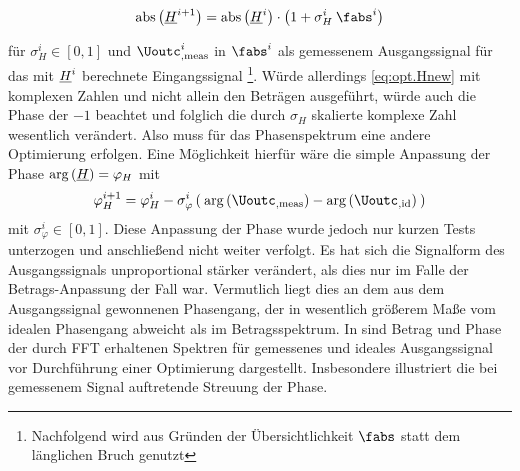 \documentclass[../Report.tex]{subfiles}
\begin{document}
\begin{align}
\label{eq:opt.Hnew}
	\mathrm{abs} \left( \Hcompl^{i+1} \right)
		=\mathrm{abs} \left( \Hcompl^{i}  \right) \cdot
		\left( 1 + \sigma_H^i \: \fabs^{i}	\right)					 
\end{align}

für $\sigma_H^i \in \left[ 0 , 1 \right]$ und $\Uoutc_{, \mathrm{meas}}^{i}$ in $\fabs^{i}$ als gemessenem Ausgangssignal für das mit $\underline{H}^{i}$ berechnete Eingangssignal \footnote{Nachfolgend wird aus Gründen der Übersichtlichkeit $\fabs$ statt dem länglichen Bruch genutzt}.
Würde allerdings \eqref{eq:opt.Hnew} mit komplexen Zahlen und nicht allein den Beträgen ausgeführt, würde auch die Phase der $-1$ beachtet und folglich die durch $\sigma_H$ skalierte komplexe Zahl wesentlich verändert. Also muss für das Phasenspektrum eine andere Optimierung erfolgen.
Eine Möglichkeit hierfür wäre die simple Anpassung der Phase $ \mathrm{arg} \left( \underline{H} \right) = \varphi_H$ mit 
\begin{align}
\label{eq:opt.HnewPhase}
	\varphi_H^{i+1} = \varphi_H^{i} - \sigma_{\varphi}^{i} 
			\left( \: \mathrm{arg} \left( \Uoutc_{, \mathrm{meas}} \right)
					- \mathrm{arg} \left( \Uoutc_{, \mathrm{id}} \right) \: \right)
\end{align}
mit $\sigma_{\varphi}^i \in \left[ 0 , 1 \right]$. Diese Anpassung der Phase wurde jedoch nur kurzen Tests unterzogen und anschließend nicht weiter verfolgt. Es hat sich die Signalform des Ausgangssignals unproportional stärker verändert, als dies nur im Falle der Betrags-Anpassung der Fall war. Vermutlich %
liegt dies an dem aus dem Ausgangssignal gewonnenen Phasengang, der in wesentlich größerem Maße vom idealen Phasengang abweicht als im Betragsspektrum. 
In  sind Betrag und Phase der durch FFT erhaltenen Spektren für gemessenes und ideales Ausgangssignal vor Durchführung einer Optimierung dargestellt. Insbesondere illustriert  die bei gemessenem Signal auftretende Streuung der Phase. 
\\


 \absSpectIdeal 
{} \absSpectMeas
{} \angleSpectIdeal 
{} \angleSpectMeas 
\end{document}

